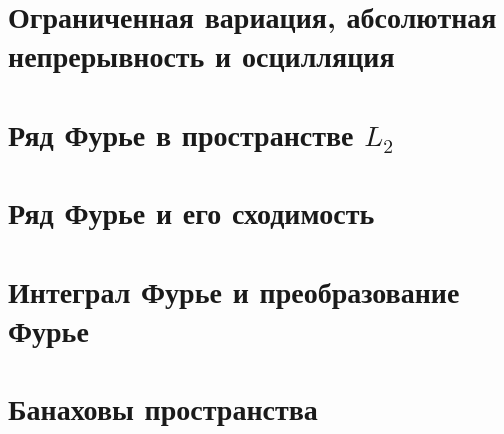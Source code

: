 % 


\section{Ограниченная вариация, абсолютная непрерывность и осцилляция}



\section{Ряд Фурье в пространстве \texorpdfstring{$L_2$}{L2}}



\section{Ряд Фурье и его сходимость}



\section{Интеграл Фурье и преобразование Фурье}



\section{Банаховы пространства}

